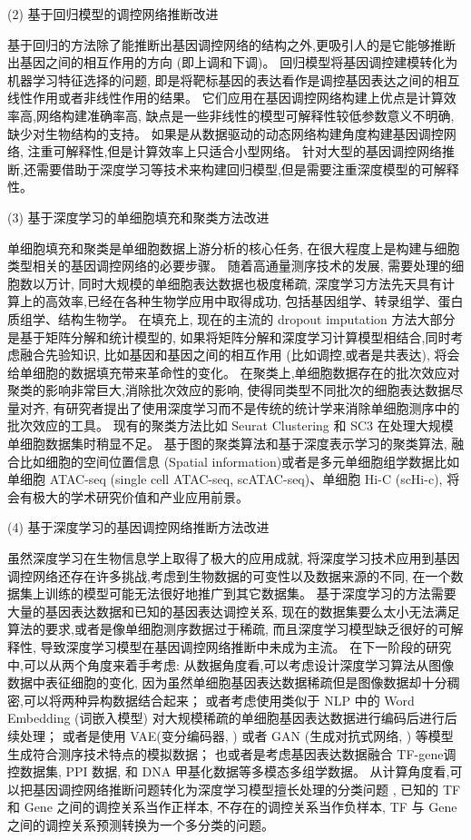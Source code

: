 (2) 基于回归模型的调控网络推断改进

基于回归的方法除了能推断出基因调控网络的结构之外,更吸引人的是它能够推断出基因之间的相互作用的方向 (即上调和下调)。
回归模型将基因调控建模转化为机器学习特征选择的问题,
即是将靶标基因的表达看作是调控基因表达之间的相互线性作用或者非线性作用的结果。
它们应用在基因调控网络构建上优点是计算效率高,网络构建准确率高,
缺点是一些非线性的模型可解释性较低参数意义不明确,缺少对生物结构的支持。
如果是从数据驱动的动态网络构建角度构建基因调控网络, 注重可解释性,但是计算效率上只适合小型网络。
针对大型的基因调控网络推断,还需要借助于深度学习等技术来构建回归模型,但是需要注重深度模型的可解释性。

(3) 基于深度学习的单细胞填充和聚类方法改进

单细胞填充和聚类是单细胞数据上游分析的核心任务, 
在很大程度上是构建与细胞类型相关的基因调控网络的必要步骤。
随着高通量测序技术的发展, 需要处理的细胞数以万计, 同时大规模的单细胞表达数据也极度稀疏,
深度学习方法先天具有计算上的高效率,已经在各种生物学应用中取得成功,
包括基因组学、转录组学、蛋白质组学、结构生物学。
在填充上, 现在的主流的 dropout imputation 方法大部分是基于矩阵分解和统计模型的,
如果将矩阵分解和深度学习计算模型相结合,同时考虑融合先验知识,
比如基因和基因之间的相互作用 (比如调控,或者是共表达),
将会给单细胞的数据填充带来革命性的变化。
在聚类上,单细胞数据存在的批次效应对聚类的影响非常巨大,消除批次效应的影响,
使得同类型不同批次的细胞表达数据尽量对齐,
有研究者提出了使用深度学习而不是传统的统计学来消除单细胞测序中的批次效应的工具。
现有的聚类方法比如 Seurat Clustering \cite{seuratv2} 和 SC3 \cite{kiselev2017sc3} 在处理大规模单细胞数据集时稍显不足。
基于图的聚类算法和基于深度表示学习的聚类算法,
融合比如细胞的空间位置信息 (Spatial information)或者是多元单细胞组学数据比如
单细胞 ATAC-seq (single cell ATAC-seq, scATAC-seq)、单细胞 Hi-C (scHi-c), 
将会有极大的学术研究价值和产业应用前景。

(4) 基于深度学习的基因调控网络推断方法改进

虽然深度学习在生物信息学上取得了极大的应用成就,
将深度学习技术应用到基因调控网络还存在许多挑战,考虑到生物数据的可变性以及数据来源的不同,
在一个数据集上训练的模型可能无法很好地推广到其它数据集。
基于深度学习的方法需要大量的基因表达数据和已知的基因表达调控关系,
现在的数据集要么太小无法满足算法的要求,或者是像单细胞测序数据过于稀疏,
而且深度学习模型缺乏很好的可解释性,
导致深度学习模型在基因调控网络推断中未成为主流。
在下一阶段的研究中,可以从两个角度来着手考虑:
从数据角度看,可以考虑设计深度学习算法从图像数据中表征细胞的变化,
因为虽然单细胞基因表达数据稀疏但是图像数据却十分稠密,可以将两种异构数据结合起来；
或者考虑使用类似于 NLP 中的 Word Embedding (词嵌入模型) 对大规模稀疏的单细胞基因表达数据进行编码后进行后续处理；
或者是使用 VAE(变分编码器, \cite{kingma2013auto}) 或者 GAN (生成对抗式网络, \cite{goodfellow2014generative}) 等模型生成符合测序技术特点的模拟数据；
也或者是考虑基因表达数据融合 TF-gene调控数据集, PPI 数据, 和 DNA 甲基化数据等多模态多组学数据。
从计算角度看,可以把基因调控网络推断问题转化为深度学习模型擅长处理的分类问题 \cite{Yuan27151}, 
已知的 TF 和 Gene 之间的调控关系当作正样本, 不存在的调控关系当作负样本,
TF 与 Gene 之间的调控关系预测转换为一个多分类的问题。